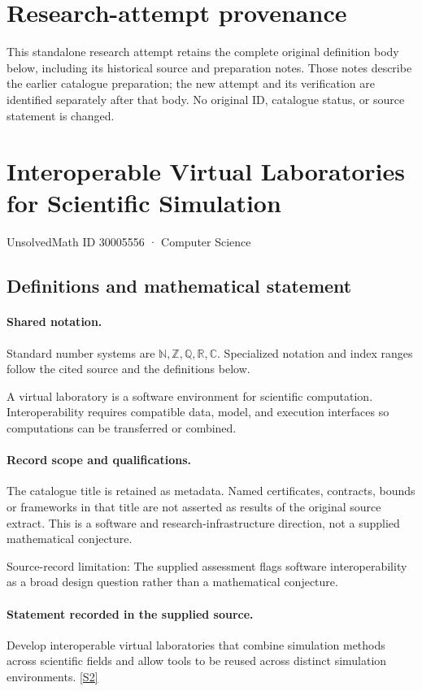 \documentclass[11pt]{article}
\begin{document}
\section*{Research-attempt provenance}
This standalone research attempt retains the complete original definition body below,
including its historical source and preparation notes. Those notes describe the
earlier catalogue preparation; the new attempt and its verification are identified
separately after that body. No original ID, catalogue status, or source statement is changed.

\section{Interoperable Virtual Laboratories for Scientific Simulation}\label{30005556}
{\small UnsolvedMath ID 30005556 · Computer Science}
\subsection{Definitions and mathematical statement}

\paragraph{Shared notation.}Standard number systems are $\mathbb N,\mathbb Z,\mathbb Q,\mathbb R,\mathbb C$. Specialized notation and index ranges follow the cited source and the definitions below.


A virtual laboratory is a software environment for scientific computation. Interoperability requires compatible data, model, and execution interfaces so computations can be transferred or combined.
\paragraph{Record scope and qualifications.}
The catalogue title is retained as metadata. Named certificates, contracts, bounds or frameworks in that title are not asserted as results of the original source extract.
This is a software and research-infrastructure direction, not a supplied mathematical conjecture.

Source-record limitation: The supplied assessment flags software interoperability as a broad design question rather than a mathematical conjecture.
\paragraph{Statement recorded in the supplied source.}
Develop interoperable virtual laboratories that combine simulation methods across scientific fields and allow tools to be reused across distinct simulation environments. \href{https://doi.org/10.4171/owr/2023/26}{[S2]}
\end{document}
